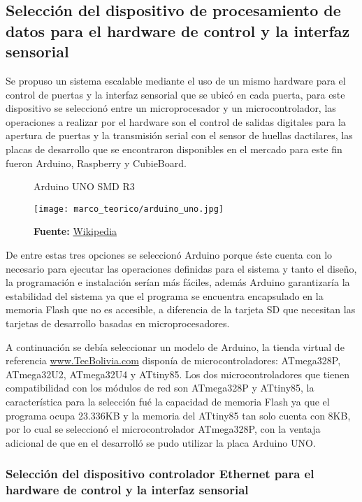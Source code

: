 \documentclass[../principal]{subfiles}
\begin{document}
  \subsection{Selección del dispositivo de procesamiento de datos para el hardware de control y la interfaz sensorial} \label{seleccion_atmega328}

  Se propuso un sistema escalable mediante el uso de un mismo hardware para el control de puertas y la interfaz sensorial que se ubicó en cada puerta, para este dispositivo se seleccionó entre un microprocesador y un microcontrolador, las operaciones a realizar por el hardware son el control de salidas digitales para la apertura de puertas y la transmisión serial con el sensor de huellas dactilares, las placas de desarrollo que se encontraron disponibles en el mercado para este fin fueron Arduino, Raspberry y CubieBoard.
  
  \begin{wrapfigure}[10]{r}{0.5\textwidth}
    \centering
    \caption{Arduino UNO SMD R3}
    \texttt{[image: marco\_teorico/arduino\_uno.jpg]}
    \caption*{\textbf{Fuente:} \href{https://en.wikipedia.org/wiki/Arduino}{Wikipedia}}
  \end{wrapfigure}

  De entre estas tres opciones se seleccionó Arduino porque éste cuenta con lo necesario para ejecutar las operaciones definidas para el sistema y tanto el diseño, la programación e instalación serían más fáciles, además Arduino garantizaría la estabilidad del sistema ya que el programa se encuentra encapsulado en la memoria Flash que no es accesible, a diferencia de la tarjeta SD que necesitan las tarjetas de desarrollo basadas en microprocesadores.

  A continuación se debía seleccionar un modelo de Arduino, la tienda virtual de referencia \href{www.TecBolivia.com}{www.TecBolivia.com} disponía de microcontroladores: ATmega328P, ATmega32U2, ATmega32U4 y ATtiny85. Los dos microcontroladores que tienen compatibilidad con los módulos de red son ATmega328P y ATtiny85, la característica para la selección fué la capacidad de memoria Flash ya que el programa ocupa 23.336KB y la memoria del ATtiny85 tan solo cuenta con 8KB, por lo cual se seleccionó el microcontrolador ATmega328P, con la ventaja adicional de que en el desarrolló se pudo utilizar la placa Arduino UNO.

  \subsubsection{Selección del dispositivo controlador Ethernet para el hardware de control y la interfaz sensorial}
\end{document}
